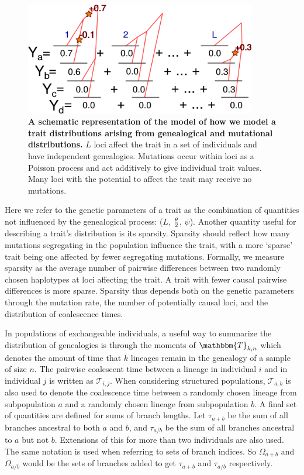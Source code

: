 \begin{figure}
  \centering
  \includegraphics[width=0.9\textwidth]{./figures/schema.png}

  \caption{\textbf{A schematic representation of the model of how we model a
  trait distributions arising from genealogical and mutational distributions.}
  $L$ loci affect the trait in a set of individuals and have independent
  genealogies. Mutations occur within loci as a Poisson process and act
  additively to give individual trait values. Many loci with the potential to
  affect the trait may receive no mutations.}

  \label{fig:schema}
\end{figure}

Here we refer to the genetic parameters of a trait as the combination of
quantities not influenced by the genealogical process: ($L$, $\frac{\theta}{2}$, $\psi$).
Another quantity useful for describing a trait's distribution is its sparsity.
Sparsity should reflect how many mutations segregating in the population
influence the trait, with a more `sparse' trait being one affected by fewer
segregating mutations. Formally, we measure sparsity as the average number of
pairwise differences between two randomly chosen haplotypes at loci affecting
the trait. A trait with fewer causal pairwise differences is more sparse.
Sparsity thus depends both on the genetic parameters through the mutation rate,
the number of potentially causal loci, and the distribution of coalescence
times.

In populations of exchangeable individuals, a useful way to summarize the
distribution of genealogies is through the moments of $\mathbbm{T}_{k,n}$ which
denotes the amount of time that $k$ lineages remain in the genealogy of a sample
of size $n$. The pairwise coalescent time between a lineage in individual $i$
and in individual $j$ is written as $\mathcal{T}_{i,j}$. When considering
structured populations, $\mathcal{T}_{a,b}$ is also used to denote the
coalescence time between a randomly chosen lineage from subpopulation $a$ and a
randomly chosen lineage from subpopulation $b$. A final set of quantities are
defined for sums of branch lengths. Let $\tau_{a+b}$ be the sum of all branches
ancestral to both $a$ and $b$, and $\tau_{a/b}$ be the sum of all branches
ancestral to $a$ but not $b$. Extensions of this for more than two individuals
are also used. The same notation is used when referring to sets of branch
indices. So $\Omega_{a+b}$ and $\Omega_{a/b}$ would be the sets of branches
added to get $\tau_{a+b}$ and $\tau_{a/b}$ respectively.

